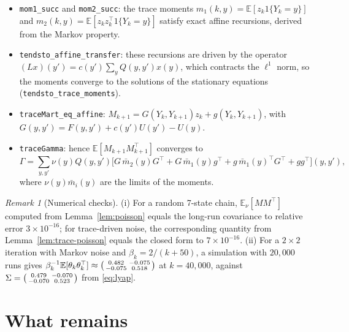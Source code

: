 \documentclass[11pt]{article}
\theoremstyle{definition}
\theoremstyle{remark}
\newtheorem{remark}[theorem]{Remark}
\newcommand{\E}{\mathbb{E}}
\begin{document}
\begin{itemize}
\item \texttt{mom1\_succ} and \texttt{mom2\_succ}: the trace moments
  $m_1(k, y) = \E[z_k1\{Y_k = y\}]$ and $m_2(k, y) = \E[z_kz_k^\top1\{Y_k = y\}]$ satisfy exact
  affine recursions, derived from the Markov property.
\item \texttt{tendsto\_affine\_transfer}: these recursions are driven by the operator
  $(Lx)(y') = c(y')\sum_yQ(y,y')x(y)$, which contracts the $\ell^1$ norm, so the moments converge
  to the solutions of the stationary equations (\texttt{tendsto\_trace\_moments}).
\item \texttt{traceMart\_eq\_affine}: $M_{k+1} = G(Y_k,Y_{k+1})z_k + g(Y_k,Y_{k+1})$, with
  $G(y,y') = F(y,y') + c(y')U(y') - U(y)$.
\item \texttt{traceGamma}: hence $\E[M_{k+1}M_{k+1}^\top]$ converges to
  \[
    \Gamma = \sum_{y,y'}\nu(y)Q(y,y')\Big[G\,\bar m_2(y)G^\top + G\,\bar m_1(y)g^\top + g\,\bar m_1(y)^\top G^\top + gg^\top\Big](y,y'),
  \]
  where $\nu(y)\bar m_i(y)$ are the limits of the moments.
\end{itemize}

\begin{remark}[Numerical checks]
(i) For a random 7-state chain, $\E_\nu[MM^\top]$ computed from Lemma~\ref{lem:poisson}
equals the long-run covariance to relative error $3\times10^{-16}$; for trace-driven noise,
the corresponding quantity from Lemma~\ref{lem:trace-poisson} equals the closed form
to $7\times10^{-16}$. (ii) For a $2\times2$ iteration with Markov noise and
$\beta_k = 2/(k + 50)$, a simulation with $20{,}000$ runs gives
$\beta_k^{-1}\E[\theta_k\theta_k^\top] \approx \begin{psmallmatrix}0.482 & -0.075\\ -0.075 & 0.518\end{psmallmatrix}$
at $k = 40{,}000$, against
$\Sigma = \begin{psmallmatrix}0.479 & -0.070\\ -0.070 & 0.523\end{psmallmatrix}$ from \eqref{eq:lyap}.
\end{remark}

\section{What remains}
\end{document}
